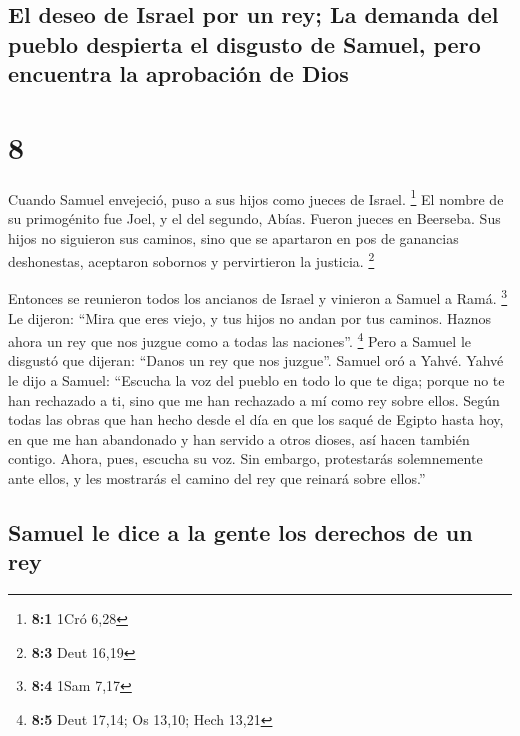 \hypertarget{el-deseo-de-israel-por-un-rey-la-demanda-del-pueblo-despierta-el-disgusto-de-samuel-pero-encuentra-la-aprobaciuxf3n-de-dios}{%
\subsection{El deseo de Israel por un rey; La demanda del pueblo
despierta el disgusto de Samuel, pero encuentra la aprobación de
Dios}\label{el-deseo-de-israel-por-un-rey-la-demanda-del-pueblo-despierta-el-disgusto-de-samuel-pero-encuentra-la-aprobaciuxf3n-de-dios}}

\hypertarget{section-7}{%
\section{8}\label{section-7}}

 Cuando Samuel envejeció, puso a sus hijos como jueces de
Israel. \footnote{\textbf{8:1} 1Cró 6,28}  El nombre de su
primogénito fue Joel, y el del segundo, Abías. Fueron jueces en
Beerseba.  Sus hijos no siguieron sus caminos, sino que se
apartaron en pos de ganancias deshonestas, aceptaron sobornos y
pervirtieron la justicia. \footnote{\textbf{8:3} Deut 16,19}

 Entonces se reunieron todos los ancianos de Israel y
vinieron a Samuel a Ramá. \footnote{\textbf{8:4} 1Sam 7,17}
 Le dijeron: ``Mira que eres viejo, y tus hijos no andan
por tus caminos. Haznos ahora un rey que nos juzgue como a todas las
naciones''. \footnote{\textbf{8:5} Deut 17,14; Os 13,10; Hech 13,21}
 Pero a Samuel le disgustó que dijeran: ``Danos un rey que
nos juzgue''. Samuel oró a Yahvé.  Yahvé le dijo a Samuel:
``Escucha la voz del pueblo en todo lo que te diga; porque no te han
rechazado a ti, sino que me han rechazado a mí como rey sobre ellos.
 Según todas las obras que han hecho desde el día en que
los saqué de Egipto hasta hoy, en que me han abandonado y han servido a
otros dioses, así hacen también contigo.  Ahora, pues,
escucha su voz. Sin embargo, protestarás solemnemente ante ellos, y les
mostrarás el camino del rey que reinará sobre ellos.''

\hypertarget{samuel-le-dice-a-la-gente-los-derechos-de-un-rey}{%
\subsection{Samuel le dice a la gente los derechos de un
rey}\label{samuel-le-dice-a-la-gente-los-derechos-de-un-rey}}

